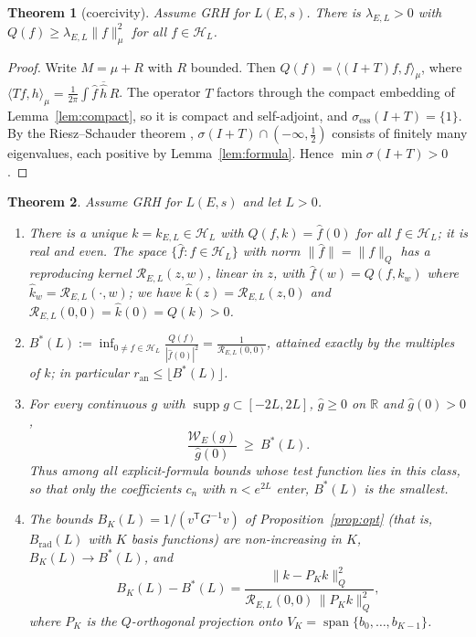 \documentclass[11pt]{amsart}
\newtheorem{theorem}{Theorem}[section]
\theoremstyle{remark}
\theoremstyle{definition}
\newcommand{\R}{\mathbb{R}}
\newcommand{\Hs}{\mathcal{H}_L}
\newcommand{\Rad}{\mathcal{R}_{E,L}}
\newcommand{\ran}{r_{\mathrm{an}}}
\DeclareMathOperator{\supp}{supp}
\begin{document}
\begin{theorem}[coercivity]\label{thm:coercive}
Assume GRH for $L(E,s)$. There is $\lambda_{E,L}>0$ with $Q(f)\ge\lambda_{E,L}\|f\|_\mu^2$ for all $f\in\Hs$.
\end{theorem}
\begin{proof}
Write $M=\mu+R$ with $R$ bounded. Then $Q(f)=\langle(I+T)f,f\rangle_\mu$, where $\langle Tf,h\rangle_\mu=\frac1{2\pi}\int\hat f\,
\overline{\hat h}\,R$. The operator $T$ factors through the compact embedding of Lemma~\ref{lem:compact}, so it is compact and
self-adjoint, and $\sigma_{\mathrm{ess}}(I+T)=\{1\}$. By the Riesz--Schauder theorem \cite[Thm.~VI.15]{RS}, $\sigma(I+T)\cap(-\infty,\tfrac12)$ consists of finitely many
eigenvalues, each positive by Lemma~\ref{lem:formula}. Hence $\min\sigma(I+T)>0$.
\end{proof}

\begin{theorem}\label{thm:main}
Assume GRH for $L(E,s)$ and let $L>0$.
\begin{enumerate}[label=\textup{(\roman*)}]
\item There is a unique $k=k_{E,L}\in\Hs$ with $Q(f,k)=\hat f(0)$ for all $f\in\Hs$; it is real and even. The space
      $\{\hat f:f\in\Hs\}$ with norm $\|\hat f\|=\|f\|_Q$ has a reproducing kernel $\Rad(z,w)$, linear in $z$, with
      $\hat f(w)=Q(f,k_w)$ where $\hat k_w=\Rad(\cdot,w)$; we have $\hat k(z)=\Rad(z,0)$ and $\Rad(0,0)=\hat k(0)=Q(k)>0$.
\item $\displaystyle B^*(L):=\inf_{0\ne f\in\Hs}\frac{Q(f)}{|\hat f(0)|^2}=\frac1{\Rad(0,0)}$, attained exactly by the
      multiples of $k$; in particular $\ran\le\lfloor B^*(L)\rfloor$.
\item For every continuous $g$ with $\supp g\subset[-2L,2L]$, $\hat g\ge0$ on $\R$ and $\hat g(0)>0$,
      \[
        \frac{\mathcal W_E(g)}{\hat g(0)}\ \ge\ B^*(L).
      \]
      Thus among all explicit-formula bounds whose test function lies in this class, so that only the coefficients
      $c_n$ with $n<e^{2L}$ enter, $B^*(L)$ is the smallest.
\item The bounds $B_K(L)=1/(v^{\mathsf T}G^{-1}v)$ of Proposition~\ref{prop:opt} (that is, $B_{\mathrm{rad}}(L)$ with $K$ basis functions) are non-increasing in $K$, $B_K(L)\to B^*(L)$, and
      \[
        B_K(L)-B^*(L)=\frac{\|k-P_Kk\|_Q^2}{\Rad(0,0)\,\|P_Kk\|_Q^2},
      \]
      where $P_K$ is the $Q$-orthogonal projection onto $V_K=\operatorname{span}\{b_0,\dots,b_{K-1}\}$.
\end{enumerate}
\end{theorem}
\end{document}

